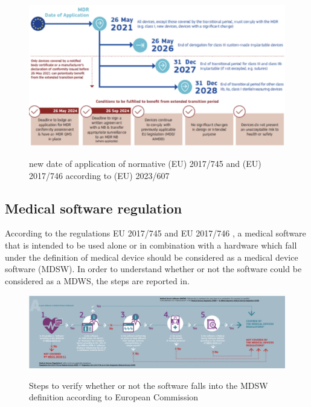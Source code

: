 \documentclass{Configuration_Files/PoliMi3i_thesis}
\begin{document}
\begin{figure}[H]
	\includegraphics[scale=0.3]{Ethics/Screenshot 2024-08-15 at 10.54.56.png}
	\centering
    \label{ethics_1}
    \caption{new date of application of normative (EU) 2017/745 and (EU) 2017/746 according to (EU) 2023/607 \cite{NewRevisedResource}}
\end{figure}

\subsection{Medical software regulation}

According to the regulations EU 2017/745 \cite{RegolamentoUE20172017} and EU 2017/746 \cite{RegolamentoUE20172017a}, a medical software that is intended to be used alone or in combination with a hardware which fall under the definition of medical device should be considered as a medical device software (MDSW). 
In order to understand whether or not the software could be considered as a MDWS, the steps are reported in.

\begin{figure}[H]

	\includegraphics[scale=0.3]{Ethics/Screenshot 2024-08-15 at 10.55.04.png}
	\centering
    \label{ethics_2}
    \caption{Steps to verify whether or not the software falls into the MDSW definition according to European Commission \cite{PublicHealthEuropean2024}}
\end{figure}
\end{document}
